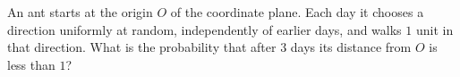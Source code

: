 An ant starts at the origin $O$ of the coordinate plane. Each day it chooses a direction uniformly at random, independently of earlier days, and walks $1$ unit in that direction. What is the probability that after $3$ days its distance from $O$ is less than $1$?
